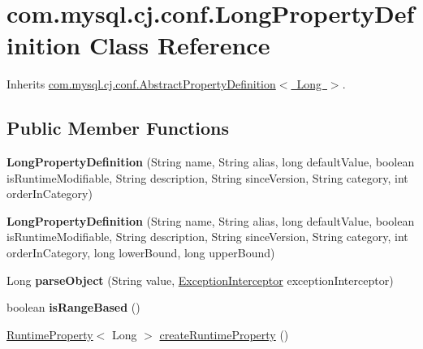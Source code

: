 \hypertarget{classcom_1_1mysql_1_1cj_1_1conf_1_1_long_property_definition}{}\section{com.\+mysql.\+cj.\+conf.\+Long\+Property\+Definition Class Reference}
\label{classcom_1_1mysql_1_1cj_1_1conf_1_1_long_property_definition}


Inherits \mbox{\hyperlink{classcom_1_1mysql_1_1cj_1_1conf_1_1_abstract_property_definition}{com.\+mysql.\+cj.\+conf.\+Abstract\+Property\+Definition$<$ Long $>$}}.

\subsection*{Public Member Functions}
\begin{DoxyCompactItemize}
\item 
\mbox{\label{classcom_1_1mysql_1_1cj_1_1conf_1_1_long_property_definition_ad5ad62b6d99ce80fe8c9ac1c3630a355}} 
{\bfseries Long\+Property\+Definition} (String name, String alias, long default\+Value, boolean is\+Runtime\+Modifiable, String description, String since\+Version, String category, int order\+In\+Category)
\item 
\mbox{\label{classcom_1_1mysql_1_1cj_1_1conf_1_1_long_property_definition_a8b7ecf1820f647c1f3a1bf8aeb81bd01}} 
{\bfseries Long\+Property\+Definition} (String name, String alias, long default\+Value, boolean is\+Runtime\+Modifiable, String description, String since\+Version, String category, int order\+In\+Category, long lower\+Bound, long upper\+Bound)
\item 
\mbox{\label{classcom_1_1mysql_1_1cj_1_1conf_1_1_long_property_definition_a2119fdeb715a2b39c165ca75cf509551}} 
Long {\bfseries parse\+Object} (String value, \mbox{\hyperlink{interfacecom_1_1mysql_1_1cj_1_1exceptions_1_1_exception_interceptor}{Exception\+Interceptor}} exception\+Interceptor)
\item 
\mbox{\label{classcom_1_1mysql_1_1cj_1_1conf_1_1_long_property_definition_a1e21f3a02b25080e02efc8303361658e}} 
boolean {\bfseries is\+Range\+Based} ()
\item 
\mbox{\hyperlink{interfacecom_1_1mysql_1_1cj_1_1conf_1_1_runtime_property}{Runtime\+Property}}$<$ Long $>$ \mbox{\hyperlink{classcom_1_1mysql_1_1cj_1_1conf_1_1_long_property_definition_a62dc153cd1b58382888d34b61cdb531c}{create\+Runtime\+Property}} ()
\end{DoxyCompactItemize}


